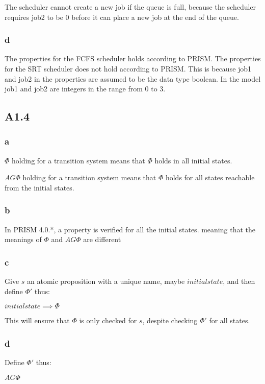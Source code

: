 The scheduler cannot create a new job if the queue is full, because the scheduler
requires job2 to be 0 before it can place a new job at the end of the queue.

\subsubsection{d}

The properties for the FCFS scheduler holds according to PRISM.
The properties for the SRT scheduler does not hold according to PRISM. This is because job1 and job2 in the properties
are assumed to be the data type boolean. In the model job1 and job2 are integers in the range from 0 to 3.

\subsection{A1.4}

\subsubsection{a}

$\Phi$ holding for a transition system means that $\Phi$ holds
in all initial states.

$AG \Phi$ holding for a transition system means that $\Phi$ holds
for all states reachable from the initial states.

\subsubsection{b}

In PRISM 4.0.*, a property is verified for all the initial states.
meaning that the meanings of $\Phi$ and $AG \Phi$ are different

\subsubsection{c}

Give $s$ an atomic proposition with a unique name,
maybe $initialstate$, and then define $\Phi '$ thus:

$initialstate \implies \Phi$

This will ensure that $\Phi$ is only checked for $s$,
despite checking $\Phi '$ for all states.

\subsubsection{d}

Define $\Phi '$ thus:

$AG \Phi$

